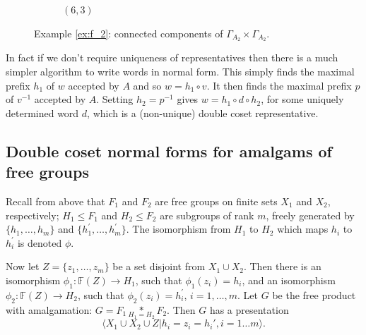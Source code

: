 \documentclass[a4paper,12pt]{article}
\newcommand{\G}{\Gamma }
\numberwithin{equation}{section}
\numberwithin{figure}{section}
\newcommand{\FF}{\ensuremath{\mathbb{F}}}
\newcommand{\la}{\langle}
\newcommand{\ra}{\rangle}
\newcommand{\maps}{\rightarrow}
\begin{document}
\begin{figure}
\begin{center}
\begin{subfigure}[b]{.13\columnwidth}
\caption{$(6,3)$}
\label{fig:G2xG2-2-6}
\end{subfigure}
\end{center}
\caption{Example \ref{ex:f_2}: connected components of $\G_{A_2}\times \G_{A_2}$.}\label{fig:G2xG2-2}
\end{figure}

In fact if we don't require uniqueness of representatives then
there is a much simpler algorithm to write words in normal form.
This simply finds the maximal prefix $h_1$ of $w$  accepted  by
$A$  and so $w=h_1\circ v$. It then finds the maximal prefix $p$
of $v^{-1}$ accepted by $A$. Setting $h_2=p^{-1}$ gives
$w=h_1\circ d \circ h_2$, for some uniquely determined word $d$,
which is a (non-unique) double coset representative.

\subsection{Double coset normal forms for amalgams of free groups}\label{sec:dcnf}

Recall from above that $F_1$ and $F_2$ are free groups on finite sets
$X_1$ and $X_2$, respectively;
 $H_1 \leq F_1$ and $H_2 \leq F_2$ are subgroups of rank $m$, freely
generated by $\{h_1,\ldots, h_m\}$ and $\{h_1^\prime,\ldots ,h_m^\prime\}$. 
The isomorphism from $H_1$ to $H_2$ which maps $h_i$ to $h_i^\prime$ is
denoted $\phi$.

Now let
$Z=\{z_1,\ldots, z_m\}$ be a set disjoint from $X_1\cup X_2$. Then there
is an isomorphism $\phi_1:\FF(Z)\maps H_1$, such that $\phi_1(z_i)=h_i$,
 and an isomorphism $\phi_2:\FF(Z)\maps H_2$, such that $\phi_2(z_i)
=h_i^\prime$, $i=1,\ldots, m$.
 Let $G$ be the free product with amalgamation:
${G = F_1 \underset{H_1=H_2}{\ast} F_2}$.  Then $G$ has a
 presentation
\[\la X_1\cup X_2\cup Z  | h_i =z_i= h_i', i=1 \ldots m\ra.\]
\end{document}
